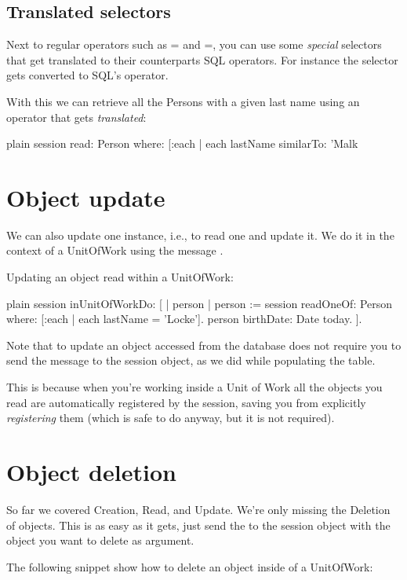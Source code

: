 \documentclass[10pt,twoside,english]{_support/latex/sbabook/sbabook}
\begin{document}
\subsection{Translated selectors}
Next to regular operators such as \textcode{}= and \textcode{\textgreater{}}=, you can use some \textit{special} selectors
that get translated to their counterparts SQL operators.
For instance the  selector gets converted to SQL's 
operator. 

With this we can retrieve all the Persons with a given last name using an operator that gets \textit{translated}: 

\begin{displaycode}{plain}
session
	read: Person
	where: [:each | each lastName similarTo: 'Malk%
\end{displaycode}
\section{Object update}
We can also update one instance, i.e., to read one and update it. We do it
in the context of a UnitOfWork using the message .

Updating an object read within a UnitOfWork:

\begin{displaycode}{plain}
session inUnitOfWorkDo: [
	| person |
	person := session
		readOneOf: Person
		where: [:each | each lastName = 'Locke'].
	person birthDate: Date today.
	].
\end{displaycode}

Note that to update an object accessed from the database does not require you to
send the message  to the session object,
as we did while populating the table.

This is because when you're working inside a Unit of Work all the objects
you read are automatically registered by the session, saving you from explicitly
\textit{registering} them (which is safe to do anyway, but it is not required).
\section{Object deletion }
So far we covered Creation, Read, and Update. We're only missing the Deletion of
objects. This is as easy as it gets, just send the  to the session
object with the object you want to delete as argument.

The following snippet show how to delete an object inside of a UnitOfWork:
\end{document}
